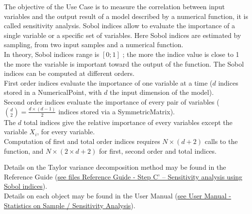 \renewcommand{\filename}{docUC_CentralUncertainty_SobolIndices.tex}
\renewcommand{\filetitle}{UC : Sensitivity analysis : Sobol indices}

\HeaderIIILevel



The objective of the Use Case is to measure the correlation between input variables and the output result of a model described by a numerical function, it is called sensitivity analysis. Sobol indices allow to evaluate the importance of a single variable or a specific set of variables. Here Sobol indices are estimated by sampling, from two input samples and a numerical function.\\
In theory, Sobol indices range is $\left[0; 1\right]$ ; the more the indice value is close to 1 the more the variable is important toward the output of the function. The Sobol indices can be computed at different orders.\\ First order indices evaluate the importance of one variable at a time ($d$ indices stored in a NumericalPoint, with $d$ the input dimension of the model).\\
Second order indices evaluate the importance of every pair of variables ($\binom{d}{2} = \frac{d \times \left( d-1\right) }{2}$ indices stored via a SymmetricMatrix).\\
The $d$ total indices give the relative importance of every variables except the variable $X_i$, for every variable.\\
Computation of first and total order indices requires $N \times (d+2)$ calls to the function, and $N \times (2 \times d + 2)$ for first, second order and total indices.


Details on the  Taylor variance decomposition method may be found in the Reference Guide (\href{OpenTURNS_ReferenceGuide.pdf}{see files Reference Guide - Step C' -- Sensitivity analysis using Sobol indices}).\\

Details on each object may be found in the User Manual  (\href{OpenTURNS_UserManual_TUI.pdf}{see User Manual - Statistics on Sample / Sensitivity Analysis}).\\


